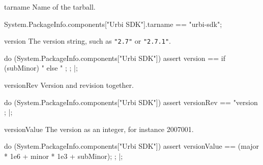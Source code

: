 \begin{urbiscriptapi}
\item[tarname] Name of the tarball.
\begin{urbiassert}
System.PackageInfo.components["Urbi SDK"].tarname
  == "urbi-sdk";
\end{urbiassert}

\item[version] The version string, such as \lstinline|"2.7"| or
  \lstinline|"2.7.1"|.
\begin{urbiscript}
do (System.PackageInfo.components["Urbi SDK"])
{
  assert
  {
    version ==
      {
        if (subMinor)
          "%
        else
          "%
      };
  };
}|;
\end{urbiscript}

\item[versionRev] Version and revision together.
\begin{urbiscript}
do (System.PackageInfo.components["Urbi SDK"])
{
  assert
  {
    versionRev
    == "version %
  };
}|;
\end{urbiscript}

\item[versionValue] The version as an integer, for instance 2007001.
\begin{urbiscript}
do (System.PackageInfo.components["Urbi SDK"])
{
  assert
  {
    versionValue == (major * 1e6 + minor * 1e3 + subMinor);
  };
}|;
\end{urbiscript}
\end{urbiscriptapi}

